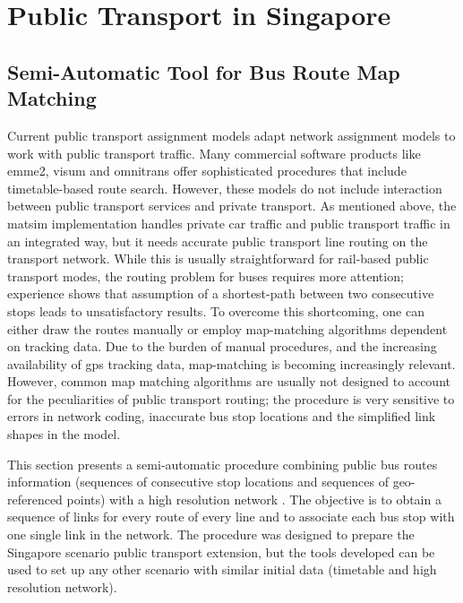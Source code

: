 \section{Public Transport in Singapore}
\subsection{Semi-Automatic Tool for Bus Route Map Matching}
\label{sec:SemiTool}
Current public transport assignment models adapt network assignment models to work with public transport traffic. Many commercial software products like \gls{emme2}, \gls{visum} and \gls{omnitrans} offer sophisticated procedures that include timetable-based route search. However, these models do not include interaction between public transport services and private transport. As mentioned above, the \gls{matsim} implementation handles private car traffic and public transport traffic in an integrated way, but it needs accurate public transport line routing on the transport network. While this is usually straightforward for rail-based public transport modes, the routing problem for buses requires more attention; experience shows that assumption of a shortest-path between two consecutive stops leads to unsatisfactory results. To overcome this shortcoming, one can either draw the routes manually or employ map-matching algorithms dependent on tracking data. Due to the burden of manual procedures, and the increasing availability of \gls{gps} tracking data, map-matching is becoming increasingly relevant. However, common map matching algorithms are usually not designed to account for the peculiarities of public transport routing; the procedure is very sensitive to errors in network coding, inaccurate bus stop locations and the simplified  link shapes in the model.

This section presents a semi-automatic procedure combining public bus routes information (sequences of consecutive stop locations and sequences of geo-referenced points) with a high resolution network \citep[][]{Ordonez_HKSTS_2011}. The objective is to obtain a sequence of links for every route of every line and to associate each bus stop with one single link in the network. The procedure was designed to prepare the Singapore scenario public transport extension, but the tools developed can be used to set up any other scenario with similar initial data (timetable and high resolution network).

